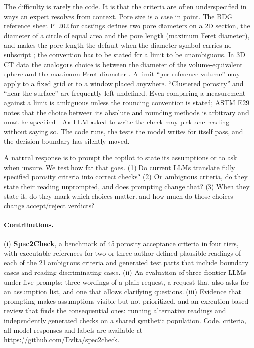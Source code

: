 \documentclass[letterpaper]{article} %
\begin{document}
The difficulty is rarely the code. It is that the criteria are often underspecified in ways an expert resolves from context. Pore size is a case in point. The BDG reference sheet P~202 for castings defines two pore diameters on a 2D section, the diameter of a circle of equal area and the pore length (maximum Feret diameter), and makes the pore length the default when the diameter symbol carries no subscript \cite{bdg_p202}; the convention has to be stated for a limit to be unambiguous. In 3D CT data the analogous choice is between the diameter of the volume-equivalent sphere and the maximum Feret diameter \cite{vgporosity}. A limit ``per reference volume'' may apply to a fixed grid or to a window placed anywhere. ``Clustered porosity'' and ``near the surface'' are frequently left undefined. Even comparing a measurement against a limit is ambiguous unless the rounding convention is stated; ASTM E29 notes that the choice between its absolute and rounding methods is arbitrary and must be specified \cite{astm_e29}. An LLM asked to write the check may pick one reading without saying so. The code runs, the tests the model writes for itself pass, and the decision boundary has silently moved.

A natural response is to prompt the copilot to state its assumptions or to ask when unsure. We test how far that goes. (1) Do current LLMs translate fully specified porosity criteria into correct checks? (2) On ambiguous criteria, do they state their reading unprompted, and does prompting change that? (3) When they state it, do they mark which choices matter, and how much do those choices change accept/reject verdicts?

\paragraph{Contributions.} (i) \textbf{Spec2Check}, a benchmark of 45 porosity acceptance criteria in four tiers, with executable references for two or three author-defined plausible readings of each of the 21 ambiguous criteria and generated test parts that include boundary cases and reading-discriminating cases. (ii) An evaluation of three frontier LLMs under five prompts: three wordings of a plain request, a request that also asks for an assumption list, and one that allows clarifying questions. (iii) Evidence that prompting makes assumptions visible but not prioritized, and an execution-based review that finds the consequential ones: running alternative readings and independently generated checks on a shared synthetic population. Code, criteria, all model responses and labels are available at \url{https://github.com/Dvlta/spec2check}.
\end{document}
